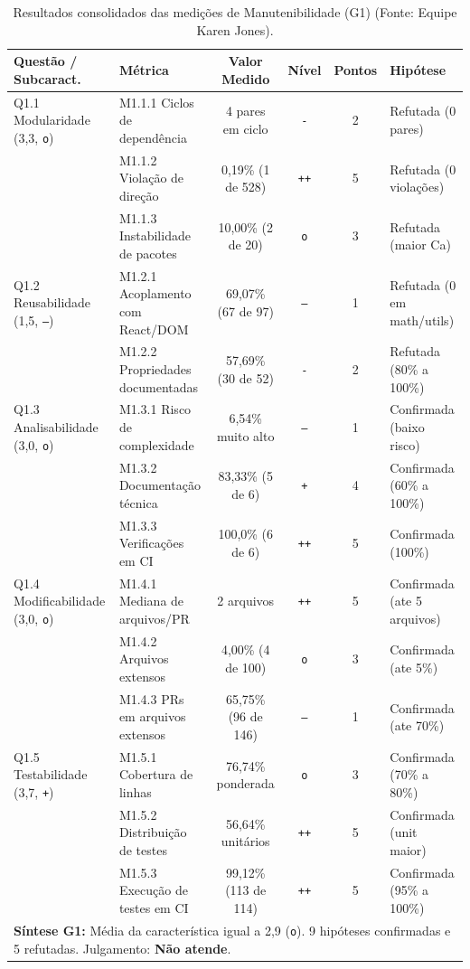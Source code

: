 \documentclass[12pt]{article}
\renewcommand{\arraystretch}{0.9}
\begin{document}
\begin{table}[!ht]
\centering
\caption{Resultados consolidados das medições de Manutenibilidade (G1) (Fonte: Equipe Karen Jones).}
\label{tab:resultados_g1}
\vspace{2pt}
\scriptsize
\setlength{\tabcolsep}{2.5pt}
\renewcommand{\arraystretch}{0.85}
\begin{tabular}{llcccl}
\toprule
\textbf{Questão / Subcaract.} & \textbf{Métrica} & \textbf{Valor Medido} & \textbf{Nível} & \textbf{Pontos} & \textbf{Hipótese} \\
\midrule
Q1.1 Modularidade (3,3, \texttt{o}) & M1.1.1 Ciclos de dependência & 4 pares em ciclo & \texttt{-} & 2 & Refutada (0 pares) \\
 & M1.1.2 Violação de direção & 0,19\% (1 de 528) & \texttt{++} & 5 & Refutada (0 violações) \\
 & M1.1.3 Instabilidade de pacotes & 10,00\% (2 de 20) & \texttt{o} & 3 & Refutada (maior Ca) \\
\midrule
Q1.2 Reusabilidade (1,5, \texttt{--}) & M1.2.1 Acoplamento com React/DOM & 69,07\% (67 de 97) & \texttt{--} & 1 & Refutada (0 em math/utils) \\
 & M1.2.2 Propriedades documentadas & 57,69\% (30 de 52) & \texttt{-} & 2 & Refutada (80\% a 100\%) \\
\midrule
Q1.3 Analisabilidade (3,0, \texttt{o}) & M1.3.1 Risco de complexidade & 6,54\% muito alto & \texttt{--} & 1 & Confirmada (baixo risco) \\
 & M1.3.2 Documentação técnica & 83,33\% (5 de 6) & \texttt{+} & 4 & Confirmada (60\% a 100\%) \\
 & M1.3.3 Verificações em CI & 100,0\% (6 de 6) & \texttt{++} & 5 & Confirmada (100\%) \\
\midrule
Q1.4 Modificabilidade (3,0, \texttt{o}) & M1.4.1 Mediana de arquivos/PR & 2 arquivos & \texttt{++} & 5 & Confirmada (ate 5 arquivos) \\
 & M1.4.2 Arquivos extensos & 4,00\% (4 de 100) & \texttt{o} & 3 & Confirmada (ate 5\%) \\
 & M1.4.3 PRs em arquivos extensos & 65,75\% (96 de 146) & \texttt{--} & 1 & Confirmada (ate 70\%) \\
\midrule
Q1.5 Testabilidade (3,7, \texttt{+}) & M1.5.1 Cobertura de linhas & 76,74\% ponderada & \texttt{o} & 3 & Confirmada (70\% a 80\%) \\
 & M1.5.2 Distribuição de testes & 56,64\% unitários & \texttt{++} & 5 & Confirmada (unit maior) \\
 & M1.5.3 Execução de testes em CI & 99,12\% (113 de 114) & \texttt{++} & 5 & Confirmada (95\% a 100\%) \\
\midrule
\multicolumn{6}{p{14.6cm}}{\textbf{Síntese G1:} Média da característica igual a 2,9 (\texttt{o}). 9 hipóteses confirmadas e 5 refutadas. Julgamento: \textbf{Não atende}.} \\
\bottomrule
\end{tabular}
\end{table}
\end{document}
